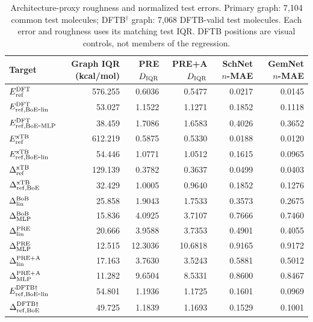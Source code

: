 \begin{table}[H]
\centering
\scriptsize
\setlength{\tabcolsep}{4pt}
\renewcommand{\arraystretch}{1.35}
\caption{Architecture-proxy roughness and normalized test errors. Primary graph: 7,104 common test molecules; DFTB$^\dagger$ graph: 7,068 DFTB-valid test molecules. Each error and roughness uses its matching test IQR. DFTB positions are visual controls, not members of the regression.}
\begin{tabular}{lrrrrr}
\toprule
Target & Graph IQR (kcal/mol) & PRE $D_{\rm IQR}$ & PRE+A $D_{\rm IQR}$ & SchNet $n$-MAE & GemNet $n$-MAE \\
\midrule
\(E_{\rm ref}^{\rm DFT}\) & 576.255 & 0.6036 & 0.5477 & 0.0217 & 0.0145 \\
\(E_{\rm ref,BoE\mbox{-}lin}^{\rm DFT}\) & 53.027 & 1.1522 & 1.1271 & 0.1852 & 0.1118 \\
\(E_{\rm ref,BoE\mbox{-}MLP}^{\rm DFT}\) & 38.459 & 1.7086 & 1.6583 & 0.4026 & 0.3652 \\
\(E_{\rm ref}^{\rm xTB}\) & 612.219 & 0.5875 & 0.5330 & 0.0188 & 0.0120 \\
\(E_{\rm ref,BoE\mbox{-}lin}^{\rm xTB}\) & 54.446 & 1.0771 & 1.0512 & 0.1615 & 0.0965 \\
\(\Delta^{\rm xTB}_{\rm ref}\) & 129.139 & 0.3782 & 0.3637 & 0.0499 & 0.0403 \\
\(\Delta^{\rm xTB}_{\rm ref,BoE}\) & 32.429 & 1.0005 & 0.9640 & 0.1852 & 0.1276 \\
\(\Delta^{\rm BoB}_{\rm lin}\) & 25.858 & 1.9043 & 1.7533 & 0.3573 & 0.2675 \\
\(\Delta^{\rm BoB}_{\rm MLP}\) & 15.836 & 4.0925 & 3.7107 & 0.7666 & 0.7460 \\
\(\Delta^{\rm PRE}_{\rm lin}\) & 20.666 & 3.9588 & 3.7353 & 0.4901 & 0.4055 \\
\(\Delta^{\rm PRE}_{\rm MLP}\) & 12.515 & 12.3036 & 10.6818 & 0.9165 & 0.9172 \\
\(\Delta^{\rm PRE+A}_{\rm lin}\) & 17.163 & 3.7630 & 3.5243 & 0.5881 & 0.5012 \\
\(\Delta^{\rm PRE+A}_{\rm MLP}\) & 11.282 & 9.6504 & 8.5331 & 0.8600 & 0.8467 \\
\(E_{\rm ref,BoE\mbox{-}lin}^{\rm DFTB\dagger}\) & 54.801 & 1.1936 & 1.1725 & 0.1601 & 0.0969 \\
\(\Delta^{\rm DFTB\dagger}_{\rm ref,BoE}\) & 49.725 & 1.1839 & 1.1693 & 0.1529 & 0.1001 \\
\bottomrule
\end{tabular}
\end{table}
